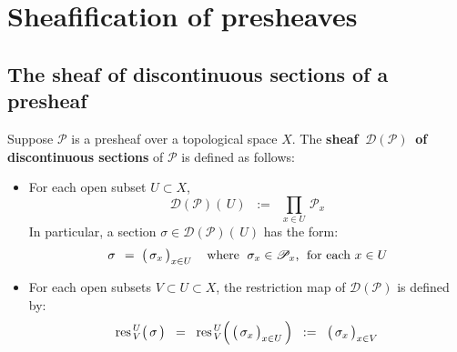 

\vskip 0.5cm
\section{Sheafification of presheaves}


\renewcommand{\theenumi}{\roman{enumi}}
\renewcommand{\labelenumi}{\textnormal{(\theenumi)}$\;\;$}


\subsection{The sheaf of discontinuous sections of a presheaf}
\setcounter{theorem}{0}
\setcounter{equation}{0}


\begin{definition}
\mbox{}\vskip 0.1cm
\noindent
Suppose $\mathscr{P}$ is a presheaf over a topological space $X$.
\vskip 0.1cm
\noindent
The \textbf{sheaf \,$\mathscr{D}(\mathscr{P})$\, of discontinuous sections} of $\mathscr{P}$
is defined as follows:
\begin{itemize}
\item
	For each open subset $U \subset X$,
	\begin{equation*}
	\mathscr{D}(\mathscr{P})(\,U)
	\;\; := \;\;
		\underset{x \in U}{\prod} \, \mathscr{P}_{x}
	\end{equation*}
	In particular, a section $\sigma \in \mathscr{D}(\mathscr{P})(\,U)$ has the form:
	\begin{equation*}
	\sigma
	\;\, = \;
		\left(\,\overset{{\color{white}.}}{\sigma_{x}}\,\right)_{x \in U}
	\quad
	\textnormal{where \;$\sigma_{x} \in \mathscr{P}_{x}$,\; for each $x \in U$}
	\end{equation*}
\item
	For each open subsets $V \subset U \subset X$,
	the restriction map of $\mathscr{D}(\mathscr{P})$ is defined by:
	\begin{equation*}
	\res^{\,U}_{\,V}\!\left(\,\overset{{\color{white}.}}{\sigma}\,\right)
	\;\; = \;\;
		\res^{\,U}_{\,V}\!\left(\,\left(\,\overset{{\color{white}.}}{\sigma_{x}}\,\right)_{x \in U}\,\right)
	\;\; := \;\;
		\left(\,\overset{{\color{white}.}}{\sigma_{x}}\,\right)_{x \in V}
	\end{equation*}
\end{itemize}
\end{definition}

